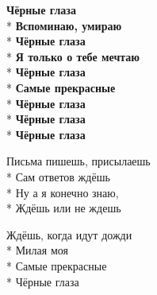 \begin{minipage}{\linewidth}
\hspace*{1.5em}\textbf{Чёрные глаза}\\*
\hspace*{1.5em}\textbf{Вспоминаю, умираю}\\*
\hspace*{1.5em}\textbf{Чёрные глаза}\\*
\hspace*{1.5em}\textbf{Я только о тебе мечтаю}\\*
\hspace*{1.5em}\textbf{Чёрные глаза}\\*
\hspace*{1.5em}\textbf{Самые прекрасные}\\*
\hspace*{1.5em}\textbf{Чёрные глаза}\\*
\hspace*{1.5em}\textbf{Чёрные глаза}\\*
\hspace*{1.5em}\textbf{Чёрные глаза}\\
\end{minipage}\par\medskip\nobreak

\medskip

\begin{minipage}{\linewidth}
Письма пишешь, присылаешь\\*
Сам ответов ждёшь\\*
Ну а я конечно знаю,\\*
Ждёшь или не ждешь\\
\end{minipage}\par\medskip\nobreak

\medskip

\begin{minipage}{\linewidth}
Ждёшь, когда идут дожди\\*
Милая моя\\*
Самые прекрасные\\*
Чёрные глаза\\
\end{minipage}\par\medskip\nobreak

\medskip

